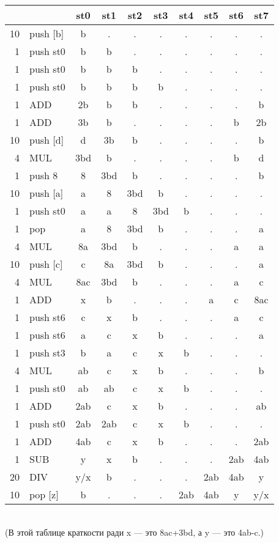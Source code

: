 \documentclass{article}
\begin{document}
    \begin{center}
        \begin{tabular}{|r|l|c|c|c|c|c|c|c|c|}
            \hline
            & & st0 & st1 & st2 & st3 & st4 & st5 & st6 & st7\\
            \hline
            10 & push [b] & b & . & . & . & . & . & . & .\\
            1 & push st0 & b & b & . & . & . & . & . & .\\
            1 & push st0 & b & b & b & . & . & . & . & .\\
            1 & push st0 & b & b & b & b & . & . & . & .\\
            1 & ADD & 2b & b & b & . & . & . & . & b\\
            1 & ADD & 3b & b & . & . & . & . & b & 2b\\
            10 & push [d] & d & 3b & b & . & . & . & . & b\\
            4 & MUL & 3bd & b & . & . & . & . & b & d\\
            1 & push 8 & 8 & 3bd & b & . & . & . & . & b\\
            10 & push [a] & a & 8 & 3bd & b & . & . & . & .\\
            1 & push st0 & a & a & 8 & 3bd & b & . & . & .\\
            1 & pop & a & 8 & 3bd & b & . & . & . & a\\
            4 & MUL & 8a & 3bd & b & . & . & . & a & a\\
            10 & push [c] & c & 8a & 3bd & b & . & . & . & a\\
            4 & MUL & 8ac & 3bd & b & . & . & . & a & c\\
            1 & ADD & x & b & . & . & . & a & c & 8ac\\%
            1 & push st6 & c & x & b & . & . & . & a & c\\
            1 & push st6 & a & c & x & b & . & . & . & a\\
            1 & push st3 & b & a & c & x & b & . & . & .\\
            4 & MUL & ab & c & x & b & . & . & . & b\\
            1 & push st0 & ab & ab & c & x & b & . & . & .\\
            1 & ADD & 2ab & c & x & b & . & . & . & ab\\
            1 & push st0 & 2ab & 2ab & c & x & b & . & . & .\\
            1 & ADD & 4ab & c & x & b & . & . & . & 2ab\\
            1 & SUB & y & x & b & . & . & . & 2ab & 4ab\\%
            20 & DIV & y/x & b & . & . & . & 2ab & 4ab & y\\
            10 & pop [z] & b & . & . & . & 2ab & 4ab & y & y/x\\
            \hline
        \end{tabular}\\
        (В этой таблице краткости ради x --- это 8ac+3bd, а y --- это 4ab-c.)
    \end{center}
\end{document}
